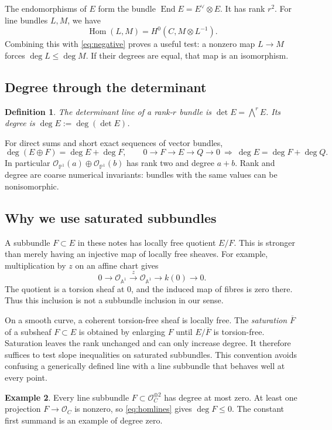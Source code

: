\documentclass[11pt,a4paper]{article}
\numberwithin{equation}{section}
\newtheorem{definition}{Definition}[section]
\theoremstyle{definition}
\newtheorem{example}[definition]{Example}
\newcommand{\OO}{\mathcal O}
\newcommand{\PP}{\mathbb P}
\newcommand{\A}{\mathbb A}
\newcommand{\Hom}{\operatorname{Hom}}
\newcommand{\End}{\operatorname{End}}
\begin{document}
The endomorphisms of $E$ form the bundle $\End E=E^\vee\otimes E$.
It has rank $r^2$. For line bundles $L,M$, we have
\begin{equation}\label{eq:homlines}
 \Hom(L,M)=H^0(C,M\otimes L^{-1}).
\end{equation}
Combining this with \eqref{eq:negative} proves a useful test:
a nonzero map $L\to M$ forces $\deg L\le\deg M$.
If their degrees are equal, that map is an isomorphism.

\subsection{Degree through the determinant}
\begin{definition}
The determinant line of a rank-$r$ bundle is
$\det E=\bigwedge^r E$. Its degree is
$\deg E:=\deg(\det E)$.
\end{definition}
For direct sums and short exact sequences of vector bundles,
\[
 \deg(E\oplus F)=\deg E+\deg F,\qquad
 0\to F\to E\to Q\to0\ \Longrightarrow\ \deg E=\deg F+\deg Q.
\]
In particular $\OO_{\PP^1}(a)\oplus\OO_{\PP^1}(b)$ has rank two
and degree $a+b$. Rank and degree are coarse numerical invariants:
bundles with the same values can be nonisomorphic.

\subsection{Why we use saturated subbundles}
A subbundle $F\subset E$ in these notes has locally free quotient
$E/F$. This is stronger than merely having an injective map of locally
free sheaves. For example, multiplication by $z$ on an affine chart gives
\[
 0\to\OO_{\A^1}\xrightarrow{\ z\ }\OO_{\A^1}
 \to k(0)\to0.
\]
The quotient is a torsion sheaf at $0$, and the induced map of fibres
is zero there. Thus this inclusion is not a subbundle inclusion in our sense.

On a smooth curve, a coherent torsion-free sheaf is locally free. The
\emph{saturation} $\overline F$ of a subsheaf $F\subset E$ is obtained
by enlarging $F$ until $E/\overline F$ is torsion-free. Saturation leaves
the rank unchanged and can only increase degree. It therefore suffices
to test slope inequalities on saturated subbundles. This convention
avoids confusing a generically defined line with a line subbundle
that behaves well at every point.

\begin{example}
Every line subbundle $F\subset\OO_C^{\oplus2}$ has degree at most zero.
At least one projection $F\to\OO_C$ is nonzero, so
\eqref{eq:homlines} gives $\deg F\le0$. The constant first summand
is an example of degree zero.
\end{example}
\end{document}
